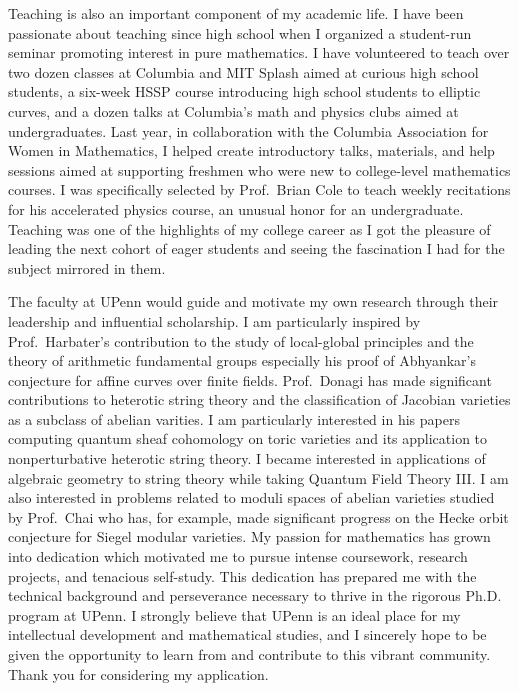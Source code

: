 \documentclass[11pt]{article}
\begin{document}
Teaching is also an important component of my academic life. I have been passionate about teaching since high school when I organized a student-run seminar promoting interest in pure mathematics. I have volunteered to teach over two dozen classes at Columbia and MIT Splash aimed at curious high school students, a six-week HSSP course introducing high school students to elliptic curves, and a dozen talks at Columbia's math and physics clubs aimed at undergraduates. Last year, in collaboration with the Columbia Association for Women in Mathematics, I helped create introductory talks, materials, and help sessions aimed at supporting freshmen who were new to college-level mathematics courses. I was specifically selected by Prof.\ Brian Cole to teach weekly recitations for his accelerated physics course, an unusual honor for an undergraduate. Teaching was one of the highlights of my college career as I got the pleasure of leading the next cohort of eager students and seeing the fascination I had for the subject mirrored in them.
\par
The faculty at UPenn would guide and motivate my own research through their leadership and influential scholarship. I am particularly inspired by Prof.\ Harbater's contribution to the study of local-global principles and the theory of arithmetic \etale fundamental groups especially his proof of Abhyankar's conjecture for affine curves over finite fields. Prof.\ Donagi has made significant contributions to heterotic string theory and the classification of Jacobian varieties as a subclass of abelian varities. I am particularly interested in his papers computing quantum sheaf cohomology on toric varieties and its application to nonperturbative heterotic string theory. I became interested in applications of algebraic geometry to string theory while taking Quantum Field Theory III. I am also interested in problems related to moduli spaces of abelian varieties studied by Prof.\ Chai who has, for example, made significant progress on the Hecke orbit conjecture for Siegel modular varieties. My passion for mathematics has grown into dedication which motivated me to pursue intense coursework, research projects, and tenacious self-study. This dedication has prepared me with the technical background and perseverance necessary to thrive in the rigorous Ph.D. program at UPenn. I strongly believe that UPenn is an ideal place for my intellectual development and mathematical studies, and I sincerely hope to be given the opportunity to learn from and contribute to this vibrant community. Thank you for considering my application.
\end{document}
